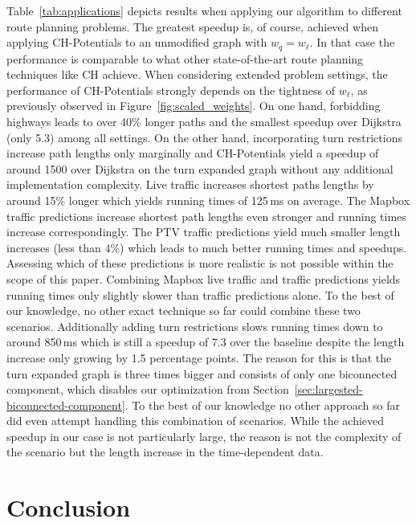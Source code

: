 \documentclass[letterpaper]{article} %
\begin{document}
Table~\ref{tab:applications} depicts results when applying our algorithm to different route planning problems.
The greatest speedup is, of course, achieved when applying CH-Potentials to an unmodified graph with $w_q = w_\ell$.
In that case the performance is comparable to what other state-of-the-art route planning techniques like CH achieve.
When considering extended problem settings, the performance of CH-Potentials strongly depends on the tightness of $w_\ell$, as previously observed in Figure~\ref{fig:scaled_weights}.
On one hand, forbidding highways leads to over 40\% longer paths and the smallest speedup over Dijkstra (only 5.3) among all settings.
On the other hand, incorporating turn restrictions increase path lengths only marginally and CH-Potentials yield a speedup of around 1500 over Dijkstra on the turn expanded graph without any additional implementation complexity. %
Live traffic increases shortest paths lengths by around 15\% longer which yields running times of 125\,ms on average.
The Mapbox traffic predictions increase shortest path lengths even stronger and running times increase correspondingly.
The PTV traffic predictions yield much smaller length increases (less than 4\%) which leads to much better running times and speedups.
Assessing which of these predictions is more realistic is not possible within the scope of this paper.
Combining Mapbox live traffic and traffic predictions yields running times only slightly slower than traffic predictions alone.
To the best of our knowledge, no other exact technique so far could combine these two scenarios.
Additionally adding turn restrictions slows running times down to around 850\,ms which is still a speedup of 7.3 over the baseline despite the length increase only growing by 1.5 percentage points.
The reason for this is that the turn expanded graph is three times bigger and consists of only one biconnected component, which disables our optimization from Section~\ref{sec:largested-biconnected-component}.
To the best of our knowledge no other approach so far did even attempt handling this combination of scenarios.
While the achieved speedup in our case is not particularly large, the reason is not the complexity of the scenario but the length increase in the time-dependent data.

\section{Conclusion}
\label{sec:conclusion}
\end{document}

